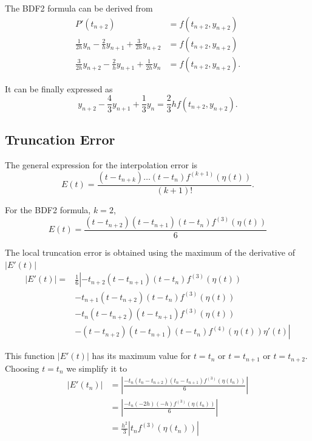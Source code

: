 \documentclass[a4paper, 11pt]{article}
\begin{document}
				The BDF2 formula can be derived from
				\begin{align}
					P'(t_{n+2}) &= f(t_{n+2},y_{n+2}) \\
					\frac{1}{2h} y_n - \frac{2}{h} y_{n+1} + \frac{3}{2h} y_{n+2} &=  f(t_{n+2},y_{n+2}) \\
					\frac{3}{2h} y_{n+2} - \frac{2}{h} y_{n+1} + \frac{1}{2h} y_n &=  f(t_{n+2},y_{n+2}).
				\end{align}
				
				It can be finally expressed as
				\begin{equation}
					y_{n+2} - \frac{4}{3} y_{n+1} + \frac{1}{3} y_n = \frac{2}{3} h f(t_{n+2},y_{n+2}).
				\end{equation}
			
			\subsection*{Truncation Error}
			
				The general expression for the interpolation error is 
				\begin{equation}
					E(t) = \frac{(t - t_{n+k})\ldots(t - t_{n})f^{(k+1)}(\eta(t))}{(k+1)!}.
				\end{equation}
			
				For the BDF2 formula, $ k = 2 $,
				\begin{equation}
					E(t) = \frac{(t - t_{n+2})(t - t_{n+1})(t - t_{n})f^{(3)}(\eta(t))}{6}
				\end{equation}
			
				The local truncation error is obtained using the maximum of the derivative of $|E'(t)|$
				\begin{align}
					\left| E'(t) \right| = &\frac{1}{6} \left| -t_{n+2}(t - t_{n+1})(t - t_{n})f^{(3)}(\eta(t)) \right. \\
					 		& \left. -t_{n+1}(t - t_{n+2})(t - t_{n})f^{(3)}(\eta(t)) \right. \\
					 		& \left. -t_{n}(t - t_{n+2})(t - t_{n+1})f^{(3)}(\eta(t)) \right. \\
					 		& \left. -(t - t_{n+2})(t - t_{n+1})(t - t_{n})f^{(4)}(\eta(t))\eta'(t) \right|
				\end{align}
			
				This function $|E'(t)|$ has its maximum value for $ t = t_n$ or $ t = t_{n+1}$ or $ t = t_{n+2}$.
				Choosing $t = t_{n}$ we simplify it to
				\begin{align}
					|E'(t_{n})| &= \left|\frac{- t_{n}(t_{n} - t_{n+2})(t_{n} - t_{n+1})f^{(3)}(\eta(t_{n}))}{6}\right| \\
							&= \left|\frac{- t_{n}(-2h)(-h)f^{(3)}(\eta(t_{n}))}{6}\right| \\
							&= \frac{h^2}{3}\left|t_nf^{(3)}(\eta(t_n))\right| 
				\end{align}
			
\end{document}
